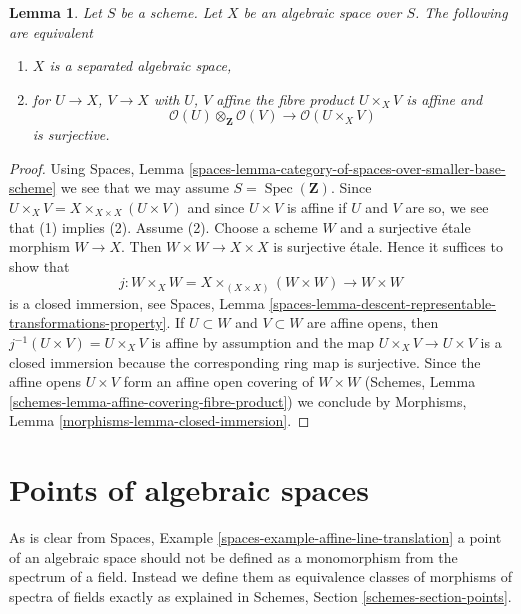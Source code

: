 \documentclass{stacks-project}
\theoremstyle{plain}
\newtheorem{lemma}[subsection]{Lemma}
\theoremstyle{definition}
\theoremstyle{remark}
\numberwithin{equation}{subsection}
\def\Spec{\mathop{\mathrm{Spec}}}
\begin{document}
\begin{lemma}
\label{lemma-characterize-separated}
Let $S$ be a scheme. Let $X$ be an algebraic space over $S$.
The following are equivalent
\begin{enumerate}
\item $X$ is a separated algebraic space,
\item for $U \to X$, $V \to X$ with $U$, $V$ affine
the fibre product $U \times_X V$ is affine and
$$
\mathcal{O}(U) \otimes_\mathbf{Z} \mathcal{O}(V)
\longrightarrow
\mathcal{O}(U \times_X V)
$$
is surjective.
\end{enumerate}
\end{lemma}

\begin{proof}
Using Spaces, Lemma
\ref{spaces-lemma-category-of-spaces-over-smaller-base-scheme}
we see that we may assume $S = \Spec(\mathbf{Z})$.
Since $U \times_X V = X \times_{X \times X} (U \times V)$
and since $U \times V$ is affine if $U$ and $V$ are so,
we see that (1) implies (2).
Assume (2). Choose a scheme $W$ and a surjective \'etale morphism
$W \to X$. Then $W \times W \to X \times X$ is surjective \'etale.
Hence it suffices to show that
$$
j : W \times_X W = X \times_{(X \times X)} (W \times W) \to W \times W
$$
is a closed immersion, see Spaces, Lemma
\ref{spaces-lemma-descent-representable-transformations-property}.
If $U \subset W$ and $V \subset W$ are affine opens, then
$j^{-1}(U \times V) = U \times_X V$ is affine by assumption
and the map $U \times_X V \to U \times V$ is a closed immersion
because the corresponding ring map is surjective.
Since the affine opens $U \times V$ form an affine open covering
of $W \times W$
(Schemes, Lemma \ref{schemes-lemma-affine-covering-fibre-product})
we conclude by
Morphisms, Lemma \ref{morphisms-lemma-closed-immersion}.
\end{proof}







\section{Points of algebraic spaces}
\label{section-points}

\noindent
As is clear from
Spaces, Example \ref{spaces-example-affine-line-translation}
a point of an algebraic space should not be defined as a monomorphism
from the spectrum of a field.
Instead we define them as equivalence classes of morphisms of spectra
of fields exactly as explained in
Schemes, Section \ref{schemes-section-points}.
\end{document}
